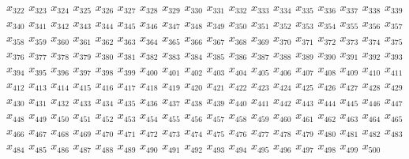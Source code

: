 $x_{322}$ $x_{323}$ $x_{324}$ $x_{325}$ $x_{326}$ $x_{327}$ $x_{328}$ $x_{329}$ $x_{330}$ $x_{331}$ $x_{332}$ $x_{333}$ $x_{334}$ $x_{335}$ $x_{336}$ $x_{337}$ $x_{338}$ $x_{339}$ $x_{340}$ $x_{341}$ $x_{342}$ $x_{343}$ $x_{344}$ $x_{345}$ $x_{346}$ $x_{347}$ $x_{348}$ $x_{349}$ $x_{350}$ $x_{351}$ $x_{352}$ $x_{353}$ $x_{354}$ $x_{355}$ $x_{356}$ $x_{357}$ $x_{358}$ $x_{359}$ $x_{360}$ $x_{361}$ $x_{362}$ $x_{363}$ $x_{364}$ $x_{365}$ $x_{366}$ $x_{367}$ $x_{368}$ $x_{369}$ $x_{370}$ $x_{371}$ $x_{372}$ $x_{373}$ $x_{374}$ $x_{375}$ $x_{376}$ $x_{377}$ $x_{378}$ $x_{379}$ $x_{380}$ $x_{381}$ $x_{382}$ $x_{383}$ $x_{384}$ $x_{385}$ $x_{386}$ $x_{387}$ $x_{388}$ $x_{389}$ $x_{390}$ $x_{391}$ $x_{392}$ $x_{393}$ $x_{394}$ $x_{395}$ $x_{396}$ $x_{397}$ $x_{398}$ $x_{399}$ $x_{400}$ $x_{401}$ $x_{402}$ $x_{403}$ $x_{404}$ $x_{405}$ $x_{406}$ $x_{407}$ $x_{408}$ $x_{409}$ $x_{410}$ $x_{411}$ $x_{412}$ $x_{413}$ $x_{414}$ $x_{415}$ $x_{416}$ $x_{417}$ $x_{418}$ $x_{419}$ $x_{420}$ $x_{421}$ $x_{422}$ $x_{423}$ $x_{424}$ $x_{425}$ $x_{426}$ $x_{427}$ $x_{428}$ $x_{429}$ $x_{430}$ $x_{431}$ $x_{432}$ $x_{433}$ $x_{434}$ $x_{435}$ $x_{436}$ $x_{437}$ $x_{438}$ $x_{439}$ $x_{440}$ $x_{441}$ $x_{442}$ $x_{443}$ $x_{444}$ $x_{445}$ $x_{446}$ $x_{447}$ $x_{448}$ $x_{449}$ $x_{450}$ $x_{451}$ $x_{452}$ $x_{453}$ $x_{454}$ $x_{455}$ $x_{456}$ $x_{457}$ $x_{458}$ $x_{459}$ $x_{460}$ $x_{461}$ $x_{462}$ $x_{463}$ $x_{464}$ $x_{465}$ $x_{466}$ $x_{467}$ $x_{468}$ $x_{469}$ $x_{470}$ $x_{471}$ $x_{472}$ $x_{473}$ $x_{474}$ $x_{475}$ $x_{476}$ $x_{477}$ $x_{478}$ $x_{479}$ $x_{480}$ $x_{481}$ $x_{482}$ $x_{483}$ $x_{484}$ $x_{485}$ $x_{486}$ $x_{487}$ $x_{488}$ $x_{489}$ $x_{490}$ $x_{491}$ $x_{492}$ $x_{493}$ $x_{494}$ $x_{495}$ $x_{496}$ $x_{497}$ $x_{498}$ $x_{499}$ $x_{500}$
